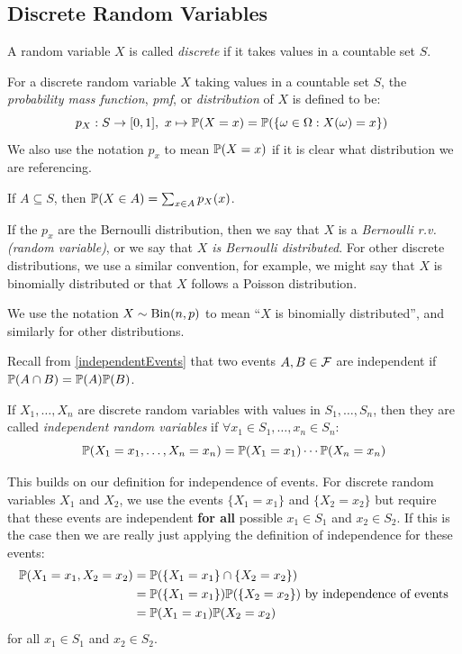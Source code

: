 \documentclass[../main.tex]{subfiles}
\begin{document}
\subsection{Discrete Random Variables}
\begin{definition}
  A random variable $X$ is called \textit{discrete} if it takes values in a countable set $S$.
\end{definition}
\begin{definition}
  For a discrete random variable $X$ taking values in a countable set $S$, the \textit{probability mass function}, \textit{pmf}, or \textit{distribution} of $X$ is defined to be:
  \label{pmf}
  \[
    p_X: S \to [0, 1],\ x \mapsto \P(X = x) = \P(\{\omega \in \Omega: X(\omega) = x\})\
  \]
  We also use the notation $p_x$ to mean $\P(X = x)$ if it is clear what distribution we are referencing.
\end{definition}
If $A \subseteq S$, then $\P(X \in A) = \sum_{x \in A} p_X(x)$.

If the $p_x$ are the Bernoulli distribution, then we say that $X$ is a \textit{Bernoulli r.v. (random variable)}, or we say that \textit{$X$ is Bernoulli distributed}.
For other discrete distributions, we use a similar convention, for example, we might say that $X$ is binomially distributed or that $X$ follows a Poisson distribution.
\begin{remark}[Notation]
  We use the notation $X \sim \binomial(n, p)$ to mean ``$X$ is binomially distributed'', and similarly for other distributions.
\end{remark}
\begin{remark}[Recap]
Recall from \cref{independentEvents} that two events $A, B \in \salg$ are independent if $\P(A \cap B) = \P(A)\P(B)$.
\end{remark}
\begin{definition}
  If $X_1, \ldots, X_n$ are discrete random variables with values in $S_1, \ldots, S_n$, then they are called \textit{independent random variables} if $\forall x_1 \in S_1, \ldots, x_n \in S_n$:
  \label{independentDiscreteRV}
  \[
    \P(X_1 = x_1, \ldots, X_n = x_n) = \P(X_1 = x_1) \cdots \P(X_n = x_n)
  \]
\end{definition}
This builds on our definition for independence of events.
For discrete random variables $X_1$ and $X_2$, we use the events $\{X_1 = x_1\}$ and $\{X_2 = x_2\}$ but require that these events are independent \textbf{for all} possible $x_1 \in S_1$ and $x_2 \in S_2$.
If this is the case then we are really just applying the definition of independence for these events:
\begin{align*}
  \P(X_1 = x_1, X_2 = x_2) &= \P(\{X_1 = x_1\} \cap \{X_2 = x_2\}) \\
                           &= \P(\{X_1 = x_1\})\P(\{X_2 = x_2\}) \text{ by independence of events} \\
                           &= \P(X_1 = x_1)\P(X_2 = x_2)
\end{align*}
for all $x_1 \in S_1$ and $x_2 \in S_2$.
\end{document}
